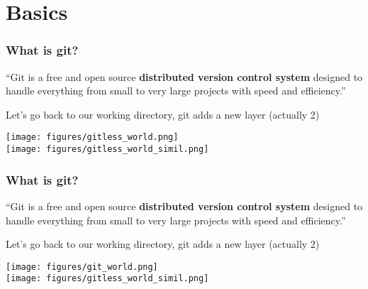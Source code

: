 \documentclass[xcolor=dvipsnames,10pt]{beamer}
\begin{document}
\section{Basics}
\begin{frame}
 \frametitle{What is git?}
 
 \begin{minipage}{1.0\textwidth}
  ``Git is a free and open source \textbf{distributed version control system} designed to handle everything from small to very large projects with speed and efficiency.''
 \end{minipage}
 \vspace*{0.4cm}
 
 \pause
 
 Let's go back to our working directory{\color{white}, git adds a new layer (actually 2)}
 
 \begin{center}
 \texttt{[image: figures/gitless\_world.png]}\\
 \texttt{[image: figures/gitless\_world\_simil.png]}  
 \end{center}
 
\end{frame}
\addtocounter{framenumber}{-1}
\begin{frame}
 \frametitle{What is git?}
 
 \begin{minipage}{1.0\textwidth}
  ``Git is a free and open source \textbf{distributed version control system} designed to handle everything from small to very large projects with speed and efficiency.''
 \end{minipage}
 \vspace*{0.4cm}
 
 Let's go back to our working directory, git adds a new layer (actually 2) 
 
 \begin{center}
 \texttt{[image: figures/git\_world.png]}\\
 \texttt{[image: figures/gitless\_world\_simil.png]}  
 \end{center}
 
\end{frame}
\addtocounter{framenumber}{-1}
\end{document}
